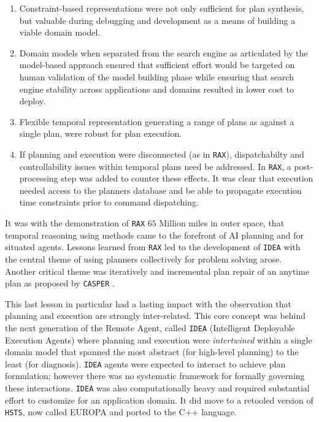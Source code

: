 \begin{enumerate}

\item Constraint-based representations were not only sufficient for
  plan synthesis, but valuable during debugging and development as a
  means of building a viable domain model.

\item Domain models when separated from the search engine as
  articulated by the model-based approach \cite{williams96a} ensured
  that sufficient effort would be targeted on human validation of the
  model building phase while ensuring that search engine stability
  across applications and domains resulted in lower cost to deploy.

\item Flexible temporal representation generating a range of plans as
  against a single plan, were robust for plan execution.

\item If planning and execution were disconnected (as in
  \texttt{RAX}), dispatchabilty \cite{mus98a} and controllability
  \cite{morris00} issues within temporal plans need be addressed. In
  \texttt{RAX}, a post-processing step was added to counter these
  effects. It was clear that execution needed access to the planners
  database and be able to propagate execution time constraints prior
  to command dispatching.

\end{enumerate}

It was with the demonstration of \texttt{RAX} $65$ Million miles in
outer space, that temporal reasoning using methods came to the
forefront of AI planning and for situated agents. Lessons learned from
\texttt{RAX} led to the development of \texttt{IDEA}
\cite{mus02,mus04,mus06} with the central theme of using planners
collectively for problem solving arose. Another critical theme was
iteratively and incremental plan repair of an anytime plan
\cite{Zaimag96} as proposed by \texttt{CASPER} \cite{chien00}.

This last lesson in particular had a lasting impact with the
observation that planning and execution are strongly
inter-related. This core concept was behind the next generation of the
Remote Agent, called \texttt{IDEA} (Intelligent Deployable Execution
Agents) where planning and execution were \emph{intertwined} within a
single domain model that spanned the most abstract (for high-level
planning) to the least (for diagnosis). \texttt{IDEA} \cite{mus02,
  mus04} agents were expected to interact to achieve plan formulation;
however there was no systematic framework for formally governing these
interactions. \texttt{IDEA} was also computationally heavy and
required substantial effort to customize for an application domain. It
did move to a retooled version of \texttt{HSTS}, now called EUROPA
\cite{frank2003, barreiro09} and ported to the C++ language.

